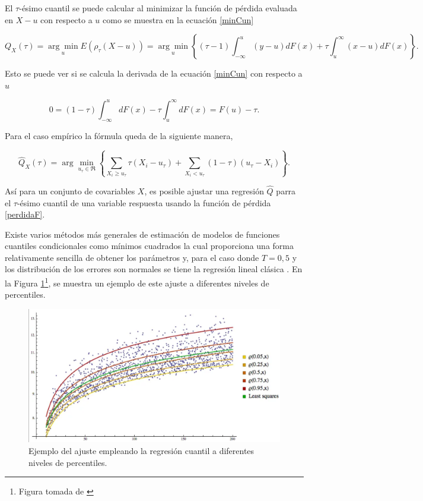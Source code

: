     El $\tau$-ésimo cuantil se puede calcular al minimizar la función de pérdida evaluada en $X-u$ con respecto a $u$ como se muestra en la ecuación \eqref{minCun} \cite{Koenker2005}
    
    \begin{equation}\label{minCun}
        Q_X(\tau)=\underset{u}{\arg \min } E\left(\rho_\tau(X-u)\right)=\underset{u}{\arg \min }\left\{(\tau-1) \int_{-\infty}^u(y-u) d F(x)+\tau \int_u^{\infty}(x-u) d F(x)\right\} .
    \end{equation}

    Esto se puede ver si se calcula la derivada de la ecuación \eqref{minCun} con respecto a $u$

    \begin{equation}\label{perdidaF}
        0=(1-\tau) \int_{-\infty}^{u} d F(x)-\tau \int_{u}^{\infty} d F(x)=F(u)-\tau.
    \end{equation}

    Para el caso empírico la fórmula queda de la siguiente manera, 

    \begin{equation}\label{qestima}
        \widehat{Q}_{X}(\tau)=\arg \min _{u_\tau \in \Re}\left\{\sum_{X_i \geq u_\tau} \tau \left(X_i-u_\tau\right)+\sum_{X_i< u_\tau}(1-\tau) \left(u_\tau-X_i\right)\right\}.
    \end{equation}

    Así para un conjunto de covariables $X$, es posible ajustar una regresión $\widehat{Q}$ parra el $\tau$-ésimo cuantil de una variable respuesta usando la función de pérdida \eqref{perdidaF}.

    Existe varios métodos más generales de estimación de modelos de funciones cuantiles condicionales como mínimos cuadrados la cual proporciona una forma relativamente sencilla de obtener los parámetros y, para el caso donde $T = 0,5$ y los distribución de los errores son normales se tiene la regresión lineal clásica \cite{Koenker2005}. En la Figura \ref{fig:regQ}\footnote{Figura tomada de \cite{ImgRegCuantile}}, se muestra un ejemplo de este ajuste a diferentes niveles de percentiles.

    \begin{figure}[H]
    \centering
    \includegraphics[width = 0.9 \textwidth]{Imagenes/Quantilsregression.png}
    \caption{Ejemplo del ajuste empleando la regresión cuantil a diferentes niveles de percentiles.}
    \label{fig:regQ}
    \end{figure}
    
